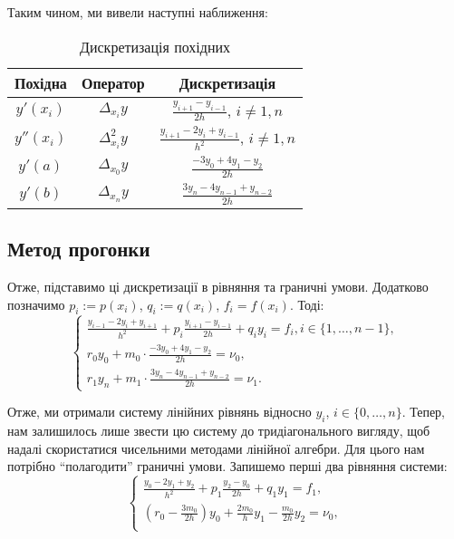 \documentclass{test_template}
\begin{document}
Таким чином, ми вивели наступні наближення:
\begin{table}[h]
    \centering
    \begin{tabular}{|c|c|c|}
        \hline
        Похідна & Оператор & Дискретизація \\
        \hline
        $y'(x_i)$ & $\Delta_{x_i}y$ & $\frac{y_{i+1}-y_{i-1}}{2h}$, $i \neq 1,n$ \\
        $y''(x_i)$ & $\Delta^2_{x_i}y$ & $\frac{y_{i+1}-2y_i+y_{i-1}}{h^2}$, $i \neq 1,n$ \\
        $y'(a)$ & $\Delta_{x_0}y$ & $\frac{-3y_0 + 4y_1 - y_2}{2h}$ \\
        $y'(b)$ & $\Delta_{x_n}y$ & $\frac{3y_n - 4y_{n-1}+y_{n-2}}{2h}$ \\
        \hline
    \end{tabular}
    \caption{Дискретизація похідних}
\end{table}

\subsection{Метод прогонки}

Отже, підставимо ці дискретизації в рівняння та граничні умови. Додатково
позначимо $p_i := p(x_i)$, $q_i := q(x_i)$, $f_i=f(x_i)$. Тоді:
\begin{equation*}
    \begin{cases}
        \frac{y_{i-1}-2y_i+y_{i+1}}{h^2} + p_i\frac{y_{i+1}-y_{i-1}}{2h} + q_iy_i = f_i, i \in \{1,\dots,n-1\},\\
        r_0y_0 + m_0 \cdot \frac{-3y_0+4y_1-y_2}{2h} = \nu_0, \\
        r_1y_n + m_1 \cdot \frac{3y_n-4y_{n-1}+y_{n-2}}{2h} = \nu_1. 
    \end{cases}
\end{equation*}

Отже, ми отримали систему лінійних рівнянь відносно $y_i$, $i \in \{0,\dots,n\}$. 
Тепер, нам залишилось лише звести цю систему до тридіагонального вигляду,
щоб надалі скористатися чисельними методами лінійної алгебри. Для 
цього нам потрібно ``полагодити'' граничні умови. Запишемо перші два рівняння системи:
\begin{equation*}
    \begin{cases}
        \frac{y_0-2y_1+y_2}{h^2} + p_1\frac{y_2-y_0}{2h} + q_1y_1 = f_1, \\
        \left(r_0 - \frac{3m_0}{2h}\right)y_0 + \frac{2m_0}{h}y_1 - \frac{m_0}{2h}y_2 = \nu_0, \\
    \end{cases}
\end{equation*}
\end{document}

